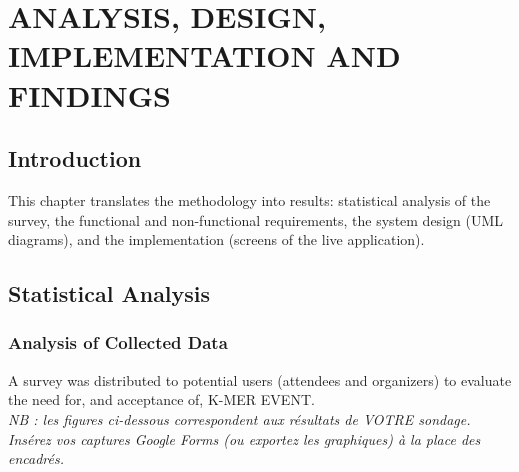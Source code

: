 \documentclass[12pt,a4paper]{report}
\begin{document}
\chapter{ANALYSIS, DESIGN, IMPLEMENTATION AND FINDINGS}

\section{Introduction}
This chapter translates the methodology into results: statistical analysis of the survey,
the functional and non-functional requirements, the system design (UML diagrams), and the
implementation (screens of the live application).

\section{Statistical Analysis}
\subsection{Analysis of Collected Data}
A survey was distributed to potential users (attendees and organizers) to evaluate the need
for, and acceptance of, K-MER EVENT.\\
\emph{NB : les figures ci-dessous correspondent aux r\'esultats de VOTRE sondage. Ins\'erez
vos captures Google Forms (ou exportez les graphiques) \`a la place des encadr\'es.}
\end{document}

